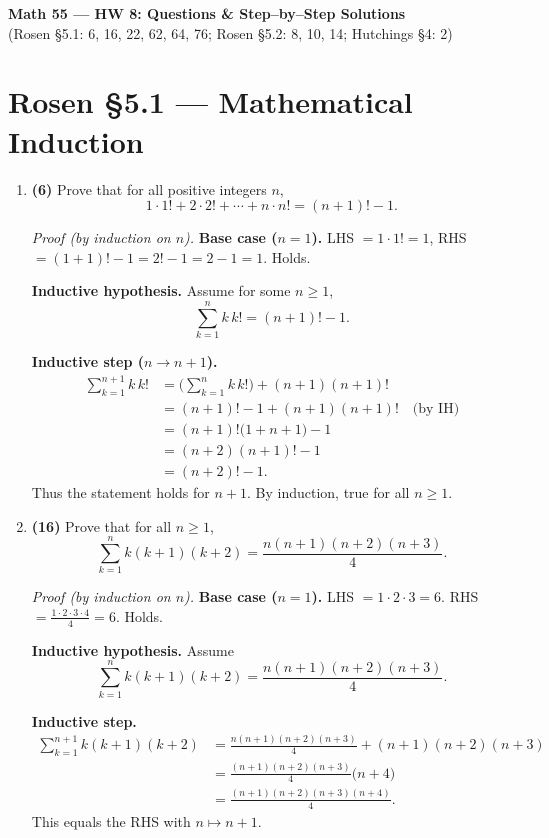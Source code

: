 \documentclass[11pt]{article}
\begin{document}
\begin{center}
{\Large \textbf{Math 55 — HW 8: Questions \& Step–by–Step Solutions}}\\[3pt]
\small (Rosen §5.1: 6, 16, 22, 62, 64, 76; Rosen §5.2: 8, 10, 14; Hutchings §4: 2)
\end{center}

\bigskip

\section*{Rosen §5.1 — Mathematical Induction}

\begin{enumerate}[label=\textbf{\arabic*.}]

\item \textbf{(6)} Prove that for all positive integers $n$,
\[
1\cdot 1!+2\cdot 2!+\cdots+n\cdot n!=(n+1)!-1.
\]

\textit{Proof (by induction on $n$).}
\textbf{Base case ($n=1$).} LHS $=1\cdot1!=1$, RHS $=(1+1)!-1=2!-1=2-1=1$. Holds.

\textbf{Inductive hypothesis.} Assume for some $n\ge1$,
\[
\sum_{k=1}^{n} k\,k!=(n+1)!-1.
\]

\textbf{Inductive step ($n\to n+1$).}
\begin{align*}
\sum_{k=1}^{n+1} k\,k!
&=\Big(\sum_{k=1}^{n} k\,k!\Big)+(n+1)(n+1)! \\
&=(n+1)!-1 + (n+1)(n+1)! \quad\text{(by IH)}\\
&=(n+1)! \big(1+n+1\big)-1\\
&=(n+2)(n+1)!-1\\
&=(n+2)!-1.
\end{align*}
Thus the statement holds for $n+1$. By induction, true for all $n\ge1$. 

\bigskip

\item \textbf{(16)} Prove that for all $n\ge 1$,
\[
\sum_{k=1}^{n} k(k+1)(k+2)=\frac{n(n+1)(n+2)(n+3)}{4}.
\]

\textit{Proof (by induction on $n$).}
\textbf{Base case ($n=1$).} LHS $=1\cdot2\cdot3=6$. RHS $=\frac{1\cdot2\cdot3\cdot4}{4}=6$. Holds.

\textbf{Inductive hypothesis.} Assume
\[
\sum_{k=1}^{n} k(k+1)(k+2)=\frac{n(n+1)(n+2)(n+3)}{4}.
\]

\textbf{Inductive step.}
\begin{align*}
\sum_{k=1}^{n+1} k(k+1)(k+2)
&=\frac{n(n+1)(n+2)(n+3)}{4} + (n+1)(n+2)(n+3)\\
&=\frac{(n+1)(n+2)(n+3)}{4}\big(n+4\big) \\
&=\frac{(n+1)(n+2)(n+3)(n+4)}{4}.
\end{align*}
This equals the RHS with $n\mapsto n+1$. 


\end{enumerate}
\end{document}
